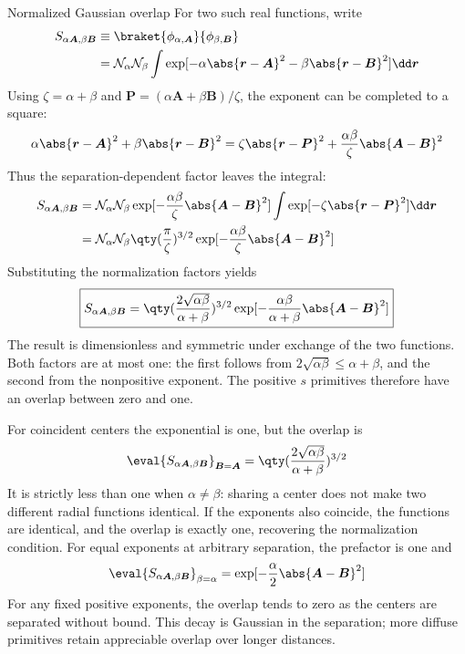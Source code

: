 \documentclass[11pt,a4paper,titlepage]{article}
\numberwithin{equation}{section}
\newcommand{\br}{\boldsymbol{r}}
\newcommand{\bA}{\boldsymbol{A}}
\newcommand{\bB}{\boldsymbol{B}}
\newcommand{\bP}{\boldsymbol{P}}
\begin{document}
\begin{hfsolution}{Normalized Gaussian overlap}
For two such real functions, write
\begin{equation}
\begin{split}
  S_{\alpha\bA,\beta\bB}
  &\equiv\braket{\phi_{\alpha,\bA}}{\phi_{\beta,\bB}}\\
  &=\mathcal{N}_\alpha\mathcal{N}_\beta
    \int\exp[-\alpha\abs{\br-\bA}^2
             -\beta\abs{\br-\bB}^2]\dd\br
\end{split}
\end{equation}
Using $\zeta=\alpha+\beta$ and
$\bP=(\alpha\bA+\beta\bB)/\zeta$, the exponent can be completed to a
square:
\begin{equation}
  \alpha\abs{\br-\bA}^2+\beta\abs{\br-\bB}^2
  =\zeta\abs{\br-\bP}^2
   +\frac{\alpha\beta}{\zeta}\abs{\bA-\bB}^2
\end{equation}
Thus the separation-dependent factor leaves the integral:
\begin{equation}
\begin{split}
  S_{\alpha\bA,\beta\bB}
  &=\mathcal{N}_\alpha\mathcal{N}_\beta
    \exp[-\frac{\alpha\beta}{\zeta}\abs{\bA-\bB}^2]
    \int\exp[-\zeta\abs{\br-\bP}^2]\dd\br\\
  &=\mathcal{N}_\alpha\mathcal{N}_\beta
    \qty(\frac{\pi}{\zeta})^{3/2}
    \exp[-\frac{\alpha\beta}{\zeta}\abs{\bA-\bB}^2]
\end{split}
\end{equation}
Substituting the normalization factors yields
\begin{equation}
  \boxed{
  S_{\alpha\bA,\beta\bB}
  =\qty(\frac{2\sqrt{\alpha\beta}}{\alpha+\beta})^{3/2}
    \exp[-\frac{\alpha\beta}{\alpha+\beta}\abs{\bA-\bB}^2]
  }
\end{equation}
The result is dimensionless and symmetric under exchange of the two
functions. Both factors are at most one: the first follows from
$2\sqrt{\alpha\beta}\leq\alpha+\beta$, and the second from the
nonpositive exponent. The positive $s$ primitives therefore have an
overlap between zero and one.

For coincident centers the exponential is one, but the overlap is
\begin{equation}
  \eval{S_{\alpha\bA,\beta\bB}}_{\bB=\bA}
  =\qty(\frac{2\sqrt{\alpha\beta}}{\alpha+\beta})^{3/2}
\end{equation}
It is strictly less than one when $\alpha\ne\beta$: sharing a center does
not make two different radial functions identical. If the exponents also
coincide, the functions are identical, and the overlap is exactly one,
recovering the normalization condition.
For equal exponents at arbitrary separation, the prefactor is one and
\begin{equation}
  \eval{S_{\alpha\bA,\beta\bB}}_{\beta=\alpha}
  =\exp[-\frac{\alpha}{2}\abs{\bA-\bB}^2]
\end{equation}
For any fixed positive exponents, the overlap tends to zero as the centers
are separated without bound. This decay is Gaussian in the separation;
more diffuse primitives retain appreciable overlap over longer distances.


\end{hfsolution}
\end{document}
